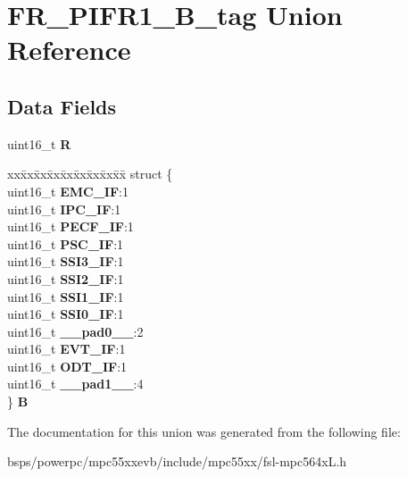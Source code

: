 \hypertarget{unionFR__PIFR1__16B__tag}{}\section{F\+R\+\_\+\+P\+I\+F\+R1\+\_\+B\+\_\+tag Union Reference}
\label{unionFR__PIFR1__16B__tag}
\subsection*{Data Fields}
\begin{DoxyCompactItemize}
\item 
\mbox{\label{unionFR__PIFR1__16B__tag_a09d3dbca91fedd481b618ae645bf4935}} 
uint16\+\_\+t {\bfseries R}
\item 
\mbox{\label{unionFR__PIFR1__16B__tag_a45e10bae10e7251481ce22e99abcde99}} 
\begin{tabbing}
xx\=xx\=xx\=xx\=xx\=xx\=xx\=xx\=xx\=\kill
struct \{\\
\>uint16\_t {\bfseries EMC\_IF}:1\\
\>uint16\_t {\bfseries IPC\_IF}:1\\
\>uint16\_t {\bfseries PECF\_IF}:1\\
\>uint16\_t {\bfseries PSC\_IF}:1\\
\>uint16\_t {\bfseries SSI3\_IF}:1\\
\>uint16\_t {\bfseries SSI2\_IF}:1\\
\>uint16\_t {\bfseries SSI1\_IF}:1\\
\>uint16\_t {\bfseries SSI0\_IF}:1\\
\>uint16\_t {\bfseries \_\_pad0\_\_}:2\\
\>uint16\_t {\bfseries EVT\_IF}:1\\
\>uint16\_t {\bfseries ODT\_IF}:1\\
\>uint16\_t {\bfseries \_\_pad1\_\_}:4\\
\} {\bfseries B}\\

\end{tabbing}\end{DoxyCompactItemize}


The documentation for this union was generated from the following file\+:\begin{DoxyCompactItemize}
\item 
bsps/powerpc/mpc55xxevb/include/mpc55xx/fsl-\/mpc564x\+L.\+h\end{DoxyCompactItemize}
